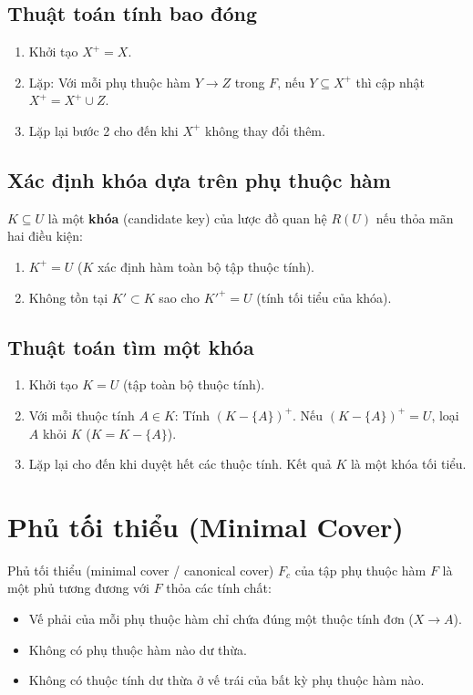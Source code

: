 \subsection{Thuật toán tính bao đóng}
\begin{enumerate}
    \item Khởi tạo $X^+ = X$.
    \item Lặp: Với mỗi phụ thuộc hàm $Y \rightarrow Z$ trong $F$, nếu $Y \subseteq X^+$ thì cập nhật $X^+ = X^+ \cup Z$.
    \item Lặp lại bước 2 cho đến khi $X^+$ không thay đổi thêm.
\end{enumerate}

\subsection{Xác định khóa dựa trên phụ thuộc hàm}
$K \subseteq U$ là một \textbf{khóa} (candidate key) của lược đồ quan hệ $R(U)$ nếu thỏa mãn hai điều kiện:
\begin{enumerate}
    \item $K^+ = U$ ($K$ xác định hàm toàn bộ tập thuộc tính).
    \item Không tồn tại $K' \subset K$ sao cho $K'^+ = U$ (tính tối tiểu của khóa).
\end{enumerate}

\subsection{Thuật toán tìm một khóa}
\begin{enumerate}
    \item Khởi tạo $K = U$ (tập toàn bộ thuộc tính).
    \item Với mỗi thuộc tính $A \in K$: Tính $(K - \{A\})^+$. Nếu $(K - \{A\})^+ = U$, loại $A$ khỏi $K$ ($K = K - \{A\}$).
    \item Lặp lại cho đến khi duyệt hết các thuộc tính. Kết quả $K$ là một khóa tối tiểu.
\end{enumerate}

\section{Phủ tối thiểu (Minimal Cover)}

Phủ tối thiểu (minimal cover / canonical cover) $F_c$ của tập phụ thuộc hàm $F$ là một phủ tương đương với $F$ thỏa các tính chất:
\begin{itemize}
    \item Vế phải của mỗi phụ thuộc hàm chỉ chứa đúng một thuộc tính đơn ($X \rightarrow A$).
    \item Không có phụ thuộc hàm nào dư thừa.
    \item Không có thuộc tính dư thừa ở vế trái của bất kỳ phụ thuộc hàm nào.
\end{itemize}

